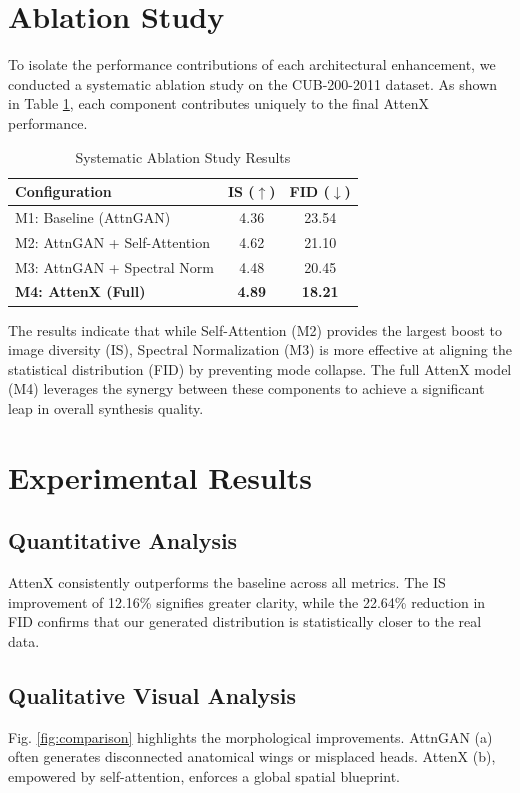 \documentclass[conference]{IEEEtran}
\begin{document}
\section{Ablation Study}
To isolate the performance contributions of each architectural enhancement, we conducted a systematic ablation study on the CUB-200-2011 dataset. As shown in Table \ref{tab:ablation}, each component contributes uniquely to the final AttenX performance.

\begin{table}[htbp]
\caption{Systematic Ablation Study Results}
\centering
\begin{tabular}{@{}lcc@{}}
\toprule
\textbf{Configuration} & \textbf{IS ($\uparrow$)} & \textbf{FID ($\downarrow$)} \\
\midrule
M1: Baseline (AttnGAN) & 4.36 & 23.54 \\
M2: AttnGAN + Self-Attention & 4.62 & 21.10 \\
M3: AttnGAN + Spectral Norm & 4.48 & 20.45 \\
\textbf{M4: AttenX (Full)} & \textbf{4.89} & \textbf{18.21} \\
\bottomrule
\end{tabular}
\label{tab:ablation}
\end{table}

The results indicate that while Self-Attention (M2) provides the largest boost to image diversity (IS), Spectral Normalization (M3) is more effective at aligning the statistical distribution (FID) by preventing mode collapse. The full AttenX model (M4) leverages the synergy between these components to achieve a significant leap in overall synthesis quality.

\section{Experimental Results}
\subsection{Quantitative Analysis}
AttenX consistently outperforms the baseline across all metrics. The IS improvement of 12.16\% signifies greater clarity, while the 22.64\% reduction in FID confirms that our generated distribution is statistically closer to the real data.

\subsection{Qualitative Visual Analysis}
Fig. \ref{fig:comparison} highlights the morphological improvements. AttnGAN (a) often generates disconnected anatomical wings or misplaced heads. AttenX (b), empowered by self-attention, enforces a global spatial blueprint.
\end{document}
